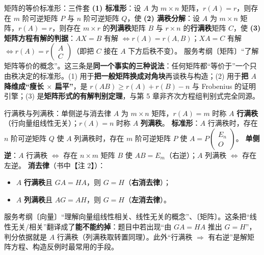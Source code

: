 \begin{fdeep}{矩阵的等价标准形：三件套}
\textbf{(1) 标准形}：设 $A$ 为 $m\times n$ 矩阵，$r(A)=r$，则存在 $m$ 阶可逆矩阵 $P$ 与 $n$ 阶可逆矩阵 $Q$，使
\textbf{(2) 满秩分解}：设 $A$ 为 $m\times n$ 矩阵，$r(A)=r$，则存在 $m\times r$ 的\textbf{列满秩}矩阵 $B$ 与 $r\times n$ 的\textbf{行满秩}矩阵 $C$，使
\textbf{(3) 矩阵方程有解的判据}：$AX=B$ 有解 $\iff r(A)=r(A,B)$；$XA=C$ 有解 $\iff r(A)=r\begin{pmatrix}A\\ C\end{pmatrix}$（即把 $C$ 接在 $A$ 下方后秩不变）。
\fbref{}服务考纲〔矩阵〕“了解矩阵等价的概念”。这三条是\textbf{同一个事实的三种说法}：任何矩阵都“等价于”一个只由秩决定的标准形。(1) 用于\textbf{把一般矩阵换成对角块}再谈秩与构造；(2) 用于\textbf{把 $A$ 降维成“瘦长 $\times$ 扁平”}，是 $r(AB)\ge r(A)+r(B)-n$ 与 Frobenius 的证明引擎；(3) 是\textbf{矩阵形式的有解判别定理}，与第 5 章非齐次方程组判别式完全同源。
\end{fdeep}

\begin{fdeep}{行满秩与列满秩：单侧逆与消去律}
$A$ 为 $m\times n$ 矩阵，$r(A)=m$ 时称 $A$ \textbf{行满秩}（行向量组线性无关）；$r(A)=n$ 时称 $A$ \textbf{列满秩}。
\textbf{标准形}：$A$ 行满秩时，存在 $n$ 阶可逆矩阵 $Q$ 使
$A$ 列满秩时，存在 $m$ 阶可逆矩阵 $P$ 使 $A=P\begin{pmatrix}E_n\\ O\end{pmatrix}$。
\textbf{单侧逆}：$A$ 行满秩 $\iff$ 存在 $n\times m$ 矩阵 $B$ 使 $AB=E_m$（右逆）；$A$ 列满秩 $\iff$ 存在左逆。
\textbf{消去律}（书中【注 2】）：
\begin{itemize}[leftmargin=2.2em,itemsep=0.22em]
\item $A$ \textbf{行满秩}且 $GA=HA$，则 $G=H$（\textbf{右消去律}）；
\item $A$ \textbf{列满秩}且 $AG=AH$，则 $G=H$（\textbf{左消去律}）。
\end{itemize}
\fbref{}服务考纲〔向量〕“理解向量组线性相关、线性无关的概念”、〔矩阵〕。这条把“线性无关/相关”翻译成了\textbf{能不能约掉}：题目中若出现“由 $GA=HA$ 推出 $G=H$”，判分依据就是 $A$ 行满秩（列满秩取转置同理）。此外“行满秩 $\Rightarrow$ 有右逆”是解矩阵方程、构造反例时最常用的手段。
\end{fdeep}

